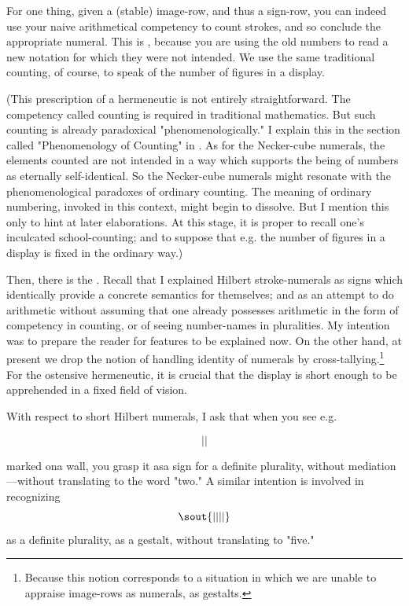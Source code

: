 For one thing, given a (stable) image-row, and thus a sign-row, you 
can indeed use your naive arithmetical competency to count strokes, 
and so conclude the appropriate numeral. This is , 
because you are using the old numbers to read a new notation for 
which they were not intended. We use the same traditional counting, of 
course, to speak of the number of figures in a display. 

(This prescription of a hermeneutic is not entirely straightforward. 
The competency called counting is required in traditional mathematics. 
But such counting is already paradoxical "phenomenologically." I 
explain this in the section called "Phenomenology of Counting" in . As for the Necker-cube numerals, 
the elements counted are not intended in a way which supports the 
being of numbers as eternally self-identical. So the Necker-cube 
numerals might resonate with the phenomenological paradoxes of 
ordinary counting. The meaning of ordinary numbering, invoked in 
this context, might begin to dissolve. But I mention this only to hint at 
later elaborations. At this stage, it is proper to recall one's inculcated 
school-counting; and to suppose that e.g. the number of figures in a 
display is fixed in the ordinary way.) 

Then, there is the . Recall that I explained 
Hilbert stroke-numerals as signs which identically provide a concrete 
semantics for themselves; and as an attempt to do arithmetic without 
assuming that one already possesses arithmetic in the form of competency 
in counting, or of seeing number-names in pluralities. My 
intention was to prepare the reader for features to be explained now. 
On the other hand, at present we drop the notion of handling identity of 
numerals by cross-tallying.\footnote{Because this notion corresponds to a situation in which we are unable to appraise image-rows as numerals, as gestalts.}
For the ostensive hermeneutic, it is crucial 
that the display is short enough to be apprehended in a fixed field of 
vision. 

With respect to short Hilbert numerals, I ask that when you see 
e.g. 

$$||$$

marked ona wall, you grasp it asa sign for a definite plurality, without 
mediation---without translating to the word "two." A similar intention 
is involved in recognizing 
$$\sout{||||}$$
as a definite plurality, as a gestalt, without translating to "five." 


